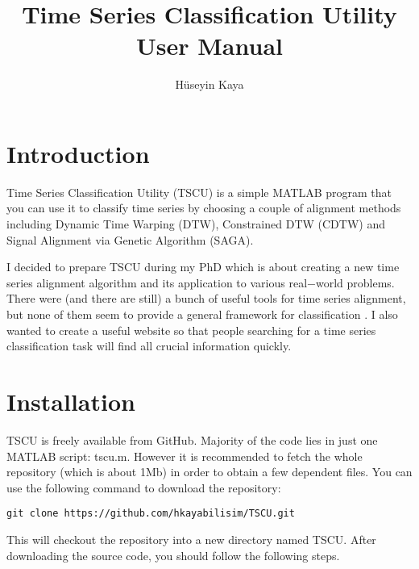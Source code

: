 \documentclass{article}
\title{Time Series Classification Utility\\ User Manual}
\author{Hüseyin Kaya}
\begin{document}
\maketitle%
\tableofcontents%

\section{Introduction}
Time Series Classification Utility (TSCU) is a simple MATLAB program that you can use it to classify time series by choosing a couple of alignment methods including Dynamic Time Warping (DTW), Constrained DTW (CDTW) and Signal Alignment via Genetic Algorithm (SAGA).

I decided to prepare TSCU during my PhD which is about creating a new time series alignment algorithm and its application to various real$-$world problems. There were (and there are still) a bunch of useful tools for time series alignment, but none of them seem to provide a general framework for classification \cite{UCRWeb}. I also wanted to create a useful website so that people searching for a time series classification task will find all crucial information quickly.
\section{Installation}
TSCU is freely available from GitHub. Majority of the code lies in just one MATLAB script: tscu.m. However it is recommended to fetch the whole repository (which is about 1Mb) in order to obtain a few dependent files. You can use the following command to download the repository:
\begin{verbatim}
git clone https://github.com/hkayabilisim/TSCU.git
\end{verbatim}
This will checkout the repository into a new directory named TSCU.\@
After downloading the source code, you should follow the following steps.
\end{document}
